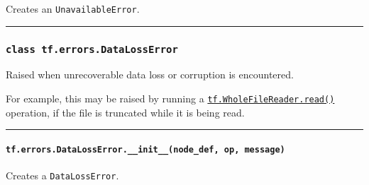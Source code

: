 Creates an \texttt{UnavailableError}.

\begin{center}\rule{0.5\linewidth}{\linethickness}\end{center}

\subsubsection{\texorpdfstring{\texttt{class\ tf.errors.DataLossError}
}{class tf.errors.DataLossError }}\label{class-tf.errors.datalosserror}

Raised when unrecoverable data loss or corruption is encountered.

For example, this may be raised by running a
\href{../../api_docs/python/io_ops.md\#WholeFileReader}{\texttt{tf.WholeFileReader.read()}}
operation, if the file is truncated while it is being read.

\begin{center}\rule{0.5\linewidth}{\linethickness}\end{center}

\paragraph{\texorpdfstring{\texttt{tf.errors.DataLossError.\_\_init\_\_(node\_def,\ op,\ message)}
}{tf.errors.DataLossError.\_\_init\_\_(node\_def, op, message) }}\label{tf.errors.datalosserror.ux5fux5finitux5fux5fnodeux5fdef-op-message}

Creates a \texttt{DataLossError}.